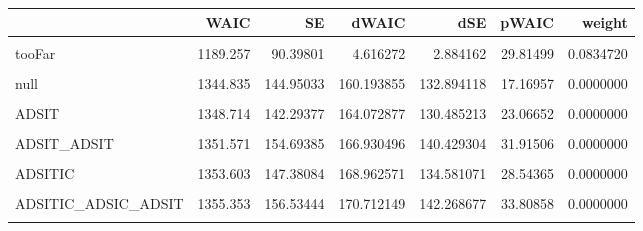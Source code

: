 \documentclass[10pt,dvipsnames,enabledeprecatedfontcommands]{scrartcl}
\begin{document}
\begin{table}[H]
\centering\begingroup\fontsize{9}{11}\selectfont

\begin{tabular}{lrrrrrr}
\toprule
  & WAIC & SE & dWAIC & dSE & pWAIC & weight\\
\midrule
\cellcolor{gray!6}{Final} & \cellcolor{gray!6}{1184.641} & \cellcolor{gray!6}{89.47387} & \cellcolor{gray!6}{0.000000} & \cellcolor{gray!6}{NA} & \cellcolor{gray!6}{26.85809} & \cellcolor{gray!6}{0.8393664}\\
tooFar & 1189.257 & 90.39801 & 4.616272 & 2.884162 & 29.81499 & 0.0834720\\
\cellcolor{gray!6}{ADSITICCBS\_ITIC\_ADSIC} & \cellcolor{gray!6}{1189.414} & \cellcolor{gray!6}{87.19709} & \cellcolor{gray!6}{4.773490} & \cellcolor{gray!6}{5.762571} & \cellcolor{gray!6}{25.62296} & \cellcolor{gray!6}{0.0771616}\\
null & 1344.835 & 144.95033 & 160.193855 & 132.894118 & 17.16957 & 0.0000000\\
\cellcolor{gray!6}{IT} & \cellcolor{gray!6}{1345.879} & \cellcolor{gray!6}{144.64185} & \cellcolor{gray!6}{161.237934} & \cellcolor{gray!6}{132.478842} & \cellcolor{gray!6}{19.27433} & \cellcolor{gray!6}{0.0000000}\\
\addlinespace
ADSIT & 1348.714 & 142.29377 & 164.072877 & 130.485213 & 23.06652 & 0.0000000\\
\cellcolor{gray!6}{ADS} & \cellcolor{gray!6}{1349.706} & \cellcolor{gray!6}{145.13624} & \cellcolor{gray!6}{165.065051} & \cellcolor{gray!6}{133.323101} & \cellcolor{gray!6}{23.10634} & \cellcolor{gray!6}{0.0000000}\\
ADSIT\_ADSIT & 1351.571 & 154.69385 & 166.930496 & 140.429304 & 31.91506 & 0.0000000\\
\cellcolor{gray!6}{ADSITIC\_ADSIC} & \cellcolor{gray!6}{1352.972} & \cellcolor{gray!6}{154.55405} & \cellcolor{gray!6}{168.331385} & \cellcolor{gray!6}{140.054704} & \cellcolor{gray!6}{30.65579} & \cellcolor{gray!6}{0.0000000}\\
ADSITIC & 1353.603 & 147.38084 & 168.962571 & 134.581071 & 28.54365 & 0.0000000\\
\addlinespace
\cellcolor{gray!6}{ADSIC} & \cellcolor{gray!6}{1353.939} & \cellcolor{gray!6}{147.29717} & \cellcolor{gray!6}{169.298374} & \cellcolor{gray!6}{134.821036} & \cellcolor{gray!6}{26.91553} & \cellcolor{gray!6}{0.0000000}\\
ADSITIC\_ADSIC\_ADSIT & 1355.353 & 156.53444 & 170.712149 & 142.268677 & 33.80858 & 0.0000000\\
\cellcolor{gray!6}{ADSITIC\_ADSIT\_ITIC\_ADSIC} & \cellcolor{gray!6}{1355.442} & \cellcolor{gray!6}{155.55820} & \cellcolor{gray!6}{170.800602} & \cellcolor{gray!6}{140.950680} & \cellcolor{gray!6}{34.03861} & \cellcolor{gray!6}{0.0000000}\\
\bottomrule
\end{tabular}
\endgroup{}
\end{table}
\end{document}
